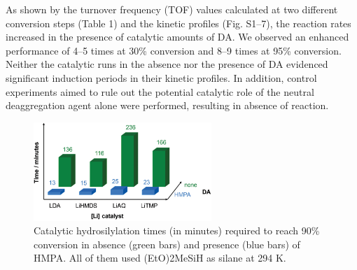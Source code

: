 \documentclass[journal=jacsat,manuscript=article]{achemso}
\begin{document}
	
	As shown by the turnover frequency (TOF) values calculated at two different conversion steps (Table 1) and the kinetic profiles (Fig. S1–7), the reaction rates increased in the presence of catalytic amounts of DA. We observed an enhanced performance	of 4–5 times at 30\% conversion and 8–9 times at 95\% conversion. Neither the catalytic runs in the absence nor the	presence of DA evidenced significant induction periods in their kinetic profiles. In addition, control experiments aimed to rule out the potential catalytic role of the neutral deaggregation agent alone were performed, resulting in absence of
	reaction.
	
	\begin{figure}[H]
		\includegraphics[width=0.6\textwidth]{figures/Bars.PNG}		
		\centering
		\caption{Catalytic hydrosilylation times (in minutes) required to reach 90\% conversion in absence (green bars) and presence (blue bars) of HMPA. All of them used (EtO)2MeSiH as silane at 294 K.}
		\label{Figure2}
	\end{figure}
\end{document}
